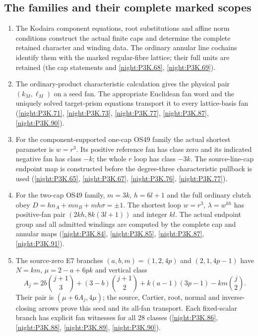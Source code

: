 \subsection{The families and their complete marked scopes}
\RungOne
\begin{enumerate}[label=\arabic*.]
\item The Kodaira component equations, root substitutions and
  affine norm conditions construct the actual finite caps and
  determine the complete retained character and winding data.
  The ordinary annular line cochains identify them with the
  marked regular-fibre lattice; their full units are retained
  (the cap statements and \cref{night:P3K.68}, \cref{night:P3K.69}).
\item The ordinary-product characteristic calculation gives the
  physical pair $(k_M,\ell_M)$ on a seed fan.  The appropriate
  Euclidean fan word and the uniquely solved target-prism equations
  transport it to every lattice-basis fan
  (\cref{night:P3K.71}, \cref{night:P3K.73}, \cref{night:P3K.77}, \cref{night:P3K.87}, \cref{night:P3K.90}).
\item For the component-supported one-cap OS49 family the actual
  shortest parameter is $w=r^3$.  Its positive reference fan has
  class zero and its indicated negative fan has class $-k$;
  the whole $r$ loop has class $-3k$.  The source-line-cap endpoint
  map is constructed before the degree-three characteristic
  pullback is used (\cref{night:P3K.65}, \cref{night:P3K.67}, \cref{night:P3K.76}, \cref{night:P3K.77}).
\item For the two-cap OS49 family, $m=3k$, $h=6l+1$ and the full
  ordinary clutch obey
  $D=hn_A+mn_B+mh\sigma=\pm1$.
  The shortest loop $w=r^3$, $\lambda=w^{kh}$ has positive-fan
  pair $(2kh,8k(3l+1))$ and integer $kl$.
  The actual endpoint group and all admitted windings are computed
  by the complete cap and annular maps
  (\cref{night:P3K.84}, \cref{night:P3K.85}, \cref{night:P3K.87}, \cref{night:P3K.91}).
\item The source-zero E7 branches
  $(a,b,m)=(1,2,4p)$ and $(2,1,4p-1)$ have
  $N=km$, $\mu=2-a+6pk$ and vertical class
  \[
  A_j=2b\binom{j+1}{3}+(3-b)\binom{j+1}{2}
      +k(a-1)(3p-1)-km\binom j2.
  \]
  Their pair is $(\mu+6A_j,4\mu)$; the source, Cartier, root,
  normal and inverse-closing arrows prove this seed and its
  all-fan transport.  Each fixed-scalar branch has explicit fan
  witnesses for all 28 classes
  (\cref{night:P3K.86}, \cref{night:P3K.88}, \cref{night:P3K.89}, \cref{night:P3K.90}).
\end{enumerate}

